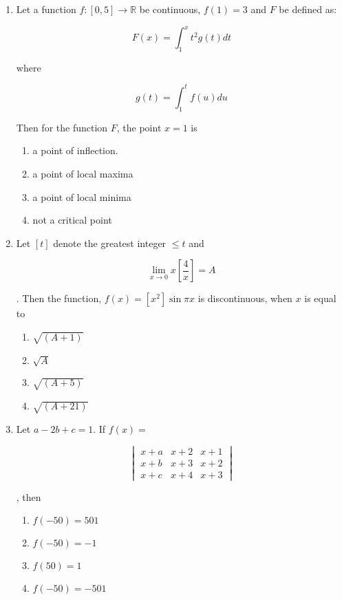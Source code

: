 \documentclass[journal]{IEEEtran}
\numberwithin{equation}{enumi}
\numberwithin{figure}{enumi}
\begin{document}
\begin{enumerate}
    \item Let a function $f:[0,5] \rightarrow \mathbb{R}$ be continuous, $f(1) = 3$ and $F$ be defined as:

        \[F(x) = \int_{1}^{x}t^{2}g(t)dt\]
        
        where
        
        \[g(t) = \int_{1}^{t}f(u)du\]
        
        Then for the function $F$, the point $x=1$ is
        
        \begin{enumerate}
        \item a point of inflection.
        \item a point of local maxima
        \item a point of local minima
        \item not a critical point
        \end{enumerate}

    \item Let $[t]$ denote the greatest integer $\leq t$ and

        \[\lim_{x\rightarrow0}x\left[\frac{4}{x}\right] = A\]
        
        . Then the function, $f(x)=[x^{2}] \sin \pi x$ is discontinuous, when $x$ is equal to
        
        \begin{enumerate}
        \item $\sqrt{(A+1)}$
        \item $\sqrt{A}$
        \item $\sqrt{(A+5)}$
        \item $\sqrt{(A+21)}$
        \end{enumerate}

    \item Let $a-2b+c=1$. If $f(x)=$

        \[\begin{vmatrix}
        x+a & x+2 & x+1 \\
        x+b & x+3 & x+2 \\
        x+c & x+4 & x+3
        \end{vmatrix}\]
        
        , then
        
        \begin{enumerate}
        \item $f(-50)=501$
        \item $f(-50)=-1$
        \item $f(50)=1$
        \item $f(-50)=-501$
        \end{enumerate}
        

\end{enumerate}
\end{document}
